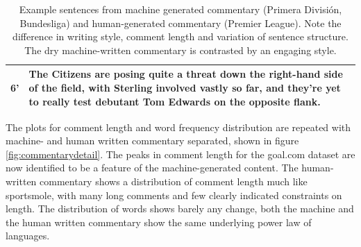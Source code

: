 \documentclass[10pt, a4paper]{UUThesisTemplate}
\begin{document}
\begin{table}
\begin{tabular}{r p{16.2cm}}
6' & The Citizens are posing quite a threat down the right-hand side of the field, with Sterling involved vastly so far, and they're yet to really test debutant Tom Edwards on the opposite flank.\\\hline
\end{tabular}
\caption{Example sentences from machine generated commentary (Primera División, Bundesliga) and human-generated commentary (Premier League). Note the difference in writing style, comment length and variation of sentence structure. The dry machine-written commentary is contrasted by an engaging style.}\label{tab:machinewritten}
\end{table}

The plots for comment length and word frequency distribution are repeated with machine- and human written commentary separated, shown in figure \ref{fig:commentarydetail}. The peaks in comment length for the goal.com dataset are now identified to be a feature of the machine-generated content. The human-written commentary shows a distribution of comment length much like sportsmole, with many long comments and few clearly indicated constraints on length. The distribution of words shows barely any change, both the machine and the human written commentary show the same underlying power law of languages. 
\end{document}

